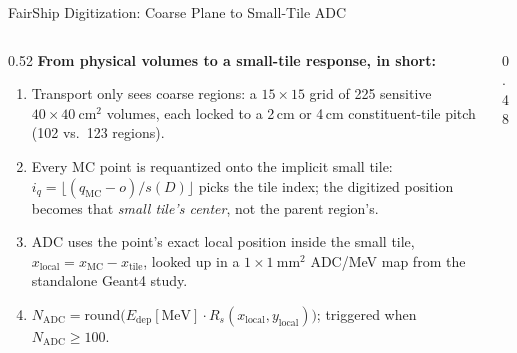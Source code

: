 \documentclass[aspectratio=169,10pt]{beamer}
\begin{document}
\begin{frame}{FairShip Digitization: Coarse Plane to Small-Tile ADC}
  \begin{columns}[T]
    \begin{column}{0.52\textwidth}
      \footnotesize
      \textbf{From physical volumes to a small-tile response, in short:}
      \begin{enumerate}
        \item Transport only sees \alert{coarse} regions: a $15\times15$
          grid of 225 sensitive $40\times40~\mathrm{cm^2}$ volumes, each
          locked to a 2\,cm or 4\,cm constituent-tile pitch (102 vs.\
          123 regions).
        \item Every MC point is \alert{requantized} onto the implicit
          small tile: $i_q=\lfloor (q_\mathrm{MC}-o)/s(D)\rfloor$ picks
          the tile index; the digitized position becomes that
          \emph{small tile's center}, not the parent region's.
        \item ADC uses the point's \alert{exact local position} inside
          the small tile, $x_\mathrm{local}=x_\mathrm{MC}-x_\mathrm{tile}$,
          looked up in a $1\times1~\mathrm{mm^2}$ ADC/MeV map from the
          standalone Geant4 study.
        \item $N_\mathrm{ADC}=\mathrm{round}\!\big(E_\mathrm{dep}[\mathrm{MeV}]
          \cdot R_s(x_\mathrm{local},y_\mathrm{local})\big)$; triggered
          when $N_\mathrm{ADC}\ge100$.
      \end{enumerate}
    \end{column}
    \begin{column}{0.48\textwidth}
      \centering
    \end{column}
  \end{columns}
\end{frame}
\end{document}
